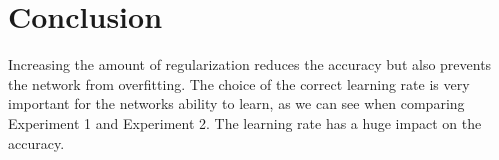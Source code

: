 \clearpage

\section{Conclusion}
Increasing the amount of regularization reduces the accuracy but also prevents the network from overfitting. The choice of the correct
learning rate is very important for the networks ability to learn, as we can see when comparing Experiment 1 and Experiment 2. The learning rate
has a huge impact on the accuracy.
